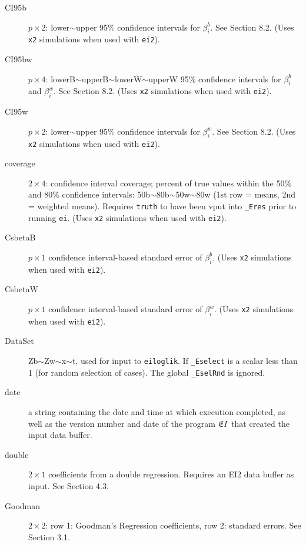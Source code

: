 \documentclass[11pt,titlepage]{article}
\newcommand{\EI}{\ensuremath{{\mathfrak EI}}}
\begin{document}
\begin{description}
\item[CI95b] $p\times 2$: lower$\sim$upper 95\% confidence intervals
  for $\beta_i^b$.  See Section 8.2.  (Uses \texttt{x2}
  simulations when used with \texttt{ei2}).

\item[CI95bw] $p\times 4$: lowerB$\sim$upperB$\sim$lowerW$\sim$upperW
  95\% confidence intervals for $\beta_i^b$ and $\beta_i^w$.  See
  Section 8.2.  (Uses \texttt{x2} simulations when used
  with \texttt{ei2}).

\item[CI95w] $p\times 2$: lower$\sim$upper 95\% confidence intervals
  for $\beta_i^w$.  See Section 8.2.  (Uses \texttt{x2}
  simulations when used with \texttt{ei2}).

\item[coverage] $2\times 4$: confidence interval coverage; percent of
  true values within the 50\% and 80\% confidence intervals:
  50b$\sim$80b$\sim$50w$\sim$80w (1st row = means, 2nd = weighted
  means).  Requires \texttt{truth} to have been vput into
  \texttt{\_Eres} prior to running \texttt{ei}.  (Uses \texttt{x2}
  simulations when used with \texttt{ei2}).

\item[CsbetaB] $p\times 1$ confidence interval-based standard error of
  $\beta_i^b$.  (Uses \texttt{x2} simulations when used with
  \texttt{ei2}).

\item[CsbetaW] $p\times 1$ confidence interval-based standard error of
  $\beta_i^w$.  (Uses \texttt{x2} simulations when used with
  \texttt{ei2}).

\item[DataSet] Zb$\sim$Zw$\sim$x$\sim$t, used for input to
  \texttt{eiloglik}.  If \texttt{\_Eselect} is a scalar less than 1
  (for random selection of cases).  The global \texttt{\_EselRnd} is
  ignored.

\item[date] a string containing the date and time at which execution
  completed, as well as the version number and date of the program
  \EI\ that created the input data buffer.

\item[double] $2\times 1$ coefficients from a double regression.
  Requires an EI2 data buffer as input.  See Section 4.3.

\item[Goodman] $2\times 2$: row 1: Goodman's Regression coefficients,
  row 2: standard errors.  See Section 3.1.


\end{description}
\end{document}
